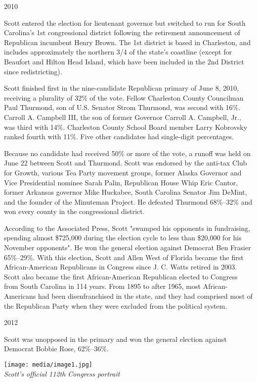 2010

Scott entered the election for lieutenant governor but switched to run
for South Carolina's 1st congressional district following the retirement
announcement of Republican incumbent Henry Brown. The 1st district is
based in Charleston, and includes approximately the northern 3/4 of the
state's coastline (except for Beaufort and Hilton Head Island, which
have been included in the 2nd District since redistricting).

Scott finished first in the nine-candidate Republican primary of June 8,
2010, receiving a plurality of 32\% of the vote. Fellow Charleston
County Councilman Paul Thurmond, son of U.S. Senator Strom Thurmond, was
second with 16\%. Carroll A. Campbell III, the son of former Governor
Carroll A. Campbell, Jr., was third with 14\%. Charleston County School
Board member Larry Kobrovsky ranked fourth with 11\%. Five other
candidates had single-digit percentages.

Because no candidate had received 50\% or more of the vote, a runoff was
held on June 22 between Scott and Thurmond. Scott was endorsed by the
anti-tax Club for Growth, various Tea Party movement groups, former
Alaska Governor and Vice Presidential nominee Sarah Palin, Republican
House Whip Eric Cantor, former Arkansas governor Mike Huckabee, South
Carolina Senator Jim DeMint, and the founder of the Minuteman Project.
He defeated Thurmond 68\%--32\% and won every county in the
congressional district.

According to the Associated Press, Scott "swamped his opponents in
fundraising, spending almost \$725,000 during the election cycle to less
than \$20,000 for his November opponents". He won the general election
against Democrat Ben Frasier 65\%--29\%. With this election, Scott and
Allen West of Florida became the first African-American Republicans in
Congress since J. C. Watts retired in 2003. Scott also became the first
African-American Republican elected to Congress from South Carolina in
114 years. From 1895 to after 1965, most African-Americans had been
disenfranchised in the state, and they had comprised most of the
Republican Party when they were excluded from the political system.

2012

Scott was unopposed in the primary and won the general election against
Democrat Bobbie Rose, 62\%--36\%.

\texttt{[image: media/image1.jpg]}\\
\emph{Scott's official 112th Congress portrait}

